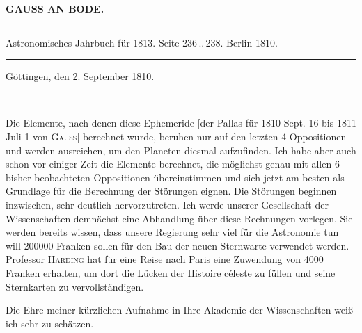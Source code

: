 \clearpage{}

\begin{center}\textbf{GAUSS AN BODE.}\par\vspace{4pt}\hrule\vspace{4pt}\fontsize{10}{12}\selectfont Astronomisches Jahrbuch für 1813. Seite 236\,..\,238. Berlin 1810.\par\vspace{4pt}\hrule\vspace{4pt}\end{center}
\begin{flushright}Göttingen, den 2. September 1810.\end{flushright}

\par\indent ---\enspace---\enspace---

\par\indent Die Elemente, nach denen diese Ephemeride [der Pallas für 1810 Sept. 16 bis 1811 Juli 1 von \textsc{Gauss}] berechnet wurde, beruhen nur auf den letzten 4 Oppositionen und werden ausreichen, um den Planeten diesmal aufzufinden. Ich habe aber auch schon vor einiger Zeit die Elemente berechnet, die möglichst genau mit allen 6 bisher beobachteten Oppositionen übereinstimmen und sich jetzt am besten als Grundlage für die Berechnung der Störungen eignen. Die Störungen beginnen inzwischen, sehr deutlich hervorzutreten. Ich werde unserer Gesellschaft der Wissenschaften demnächst eine Abhandlung über diese Rechnungen vorlegen. Sie werden bereits wissen, dass unsere Regierung sehr viel für die Astronomie tun will 200000 Franken sollen für den Bau der neuen Sternwarte verwendet werden. Professor \textsc{Harding} hat für eine Reise nach Paris eine Zuwendung von 4000 Franken erhalten, um dort die Lücken der Histoire céleste zu füllen und seine Sternkarten zu vervollständigen.

Die Ehre meiner kürzlichen Aufnahme in Ihre Akademie der Wissenschaften weiß ich sehr zu schätzen.
